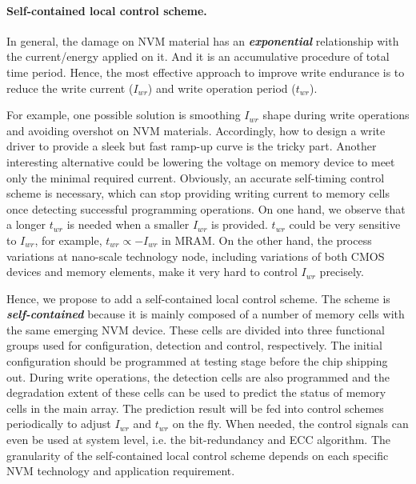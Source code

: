 \paragraph{Self-contained local control scheme.} In general, the damage on NVM material has an \textbf{\emph{exponential}} relationship with the current/energy applied on it. And it is an accumulative procedure of total time period. Hence, the most effective approach to improve write endurance is to reduce the write current ($I_{wr}$) and write operation period ($t_{wr}$).

For example, one possible solution is smoothing $I_{wr}$ shape during write operations and avoiding overshot on NVM materials. Accordingly, how to design a write driver to provide a sleek but fast ramp-up curve is the tricky part. Another interesting alternative could be lowering the voltage on memory device to meet only the minimal required current. Obviously, an accurate self-timing control scheme is necessary, which can stop providing writing current to memory cells once detecting successful programming operations. On one hand, we observe that a longer $t_{wr}$ is needed when a smaller $I_{wr}$ is provided. $t_{wr}$ could be very sensitive to $I_{wr}$, for example, $t_{wr}\propto{-I_{wr}}$ in MRAM. On the other hand, the process variations at nano-scale technology node, including variations of both CMOS devices and memory elements, make it very hard to control $I_{wr}$ precisely.

Hence, we propose to add a self-contained local control scheme. The scheme is \emph{\textbf{self-contained}} because it is mainly composed of a number of memory cells with the same emerging NVM device. These cells are divided into three functional groups used for configuration, detection and control, respectively. The initial configuration should be programmed at testing stage before the chip shipping out. During write operations, the detection cells are also programmed and the degradation extent of these cells can be used to predict the status of memory cells in the main array. The prediction result will be fed into control schemes periodically to adjust $I_{wr}$ and $t_{wr}$ on the fly. When needed, the control signals can even be used at system level, i.e. the bit-redundancy and ECC algorithm. The granularity of the self-contained local control scheme depends on each specific NVM technology and application requirement.

